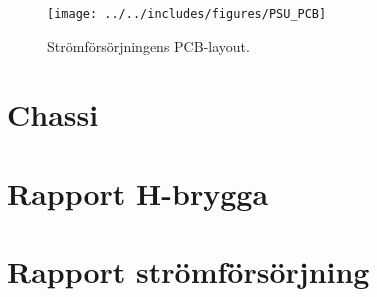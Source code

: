 \begin{landscape}
\begin{figure}[htbp!]
\centering
\texttt{[image: ../../includes/figures/PSU\_PCB]}
\caption{Strömförsörjningens PCB-layout.}
\label{fig:appendix_PSU_pcb_layout}
\end{figure}
\end{landscape}

\section{Chassi}


\newpage
\section{Rapport H-brygga}
\label{apx:H-bridge}


\section{Rapport strömförsörjning}
\label{apx:PSU}

